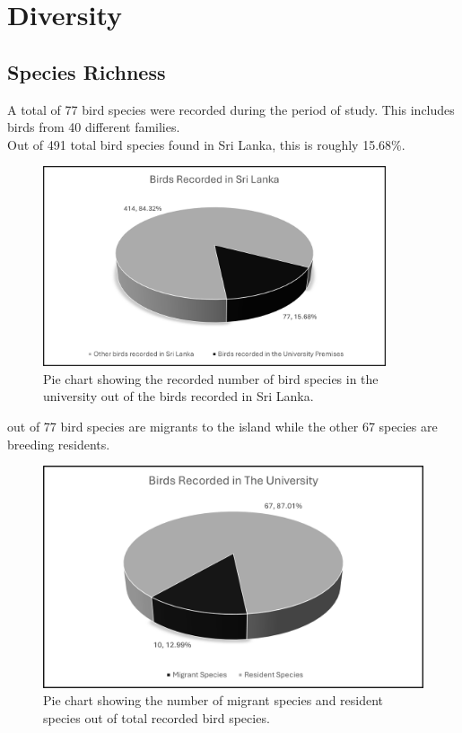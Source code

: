 \chapter{Diversity}
\label{cp:Diversity}

\section{Species Richness}
A total of 77 bird species were recorded during the period of study. This includes birds from 40 different families.\\
Out of 491 total bird species found in Sri Lanka, this is roughly 15.68\%.

\begin{figure}[!htpb]
    \centering
    \includegraphics[width=0.9\textwidth]{Figures/pieChart1.png}
    \caption[]{Pie chart showing the recorded number of bird species in the university out of the birds recorded in Sri Lanka.}
    \label{fig:figure-01}
\end{figure}
 out of 77 bird species are migrants to the island while the other 67 species are breeding residents. 

\begin{figure}[!htpb]
    \centering
    \includegraphics[width=\linewidth]{Figures/pieChart2.png}
    \caption[]{Pie chart showing the number of migrant species and resident species out of total recorded bird species.}
    \label{fig:figure-01}
\end{figure}

